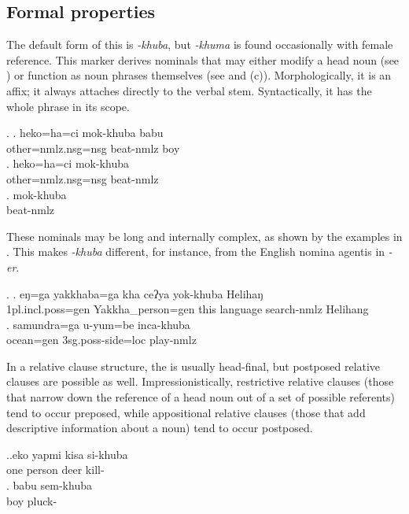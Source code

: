 \subsection{Formal properties} 
The default form of this  is \emph{-khuba}, but \emph{-khuma} is found occasionally with female reference. This marker derives nominals that may either modify a head noun (see \Next[a]) or function as noun phrases themselves (see \Next[b] and (c)). Morphologically, it is an affix; it always attaches directly to the verbal stem. Syntactically, it has the whole phrase  in its scope.
\newpage 

\ex. \ag.   heko=ha=ci mok-khuba babu\\
			other{\sc =nmlz.nsg=nsg} beat{\sc -nmlz} boy\\
			\bg. heko=ha=ci mok-khuba \\
			other{\sc =nmlz.nsg=nsg} beat{\sc -nmlz} \\
			\bg. mok-khuba\\
			beat{\sc -nmlz}\\
	
These nominals may be long and internally complex, as shown by the examples in \Next. This makes \emph{-khuba} different, for instance, from the English nomina agentis in \emph{-er}.
	
\ex. \ag.	eŋ=ga yakkhaba=ga kha  ceʔya   yok-khuba Helihaŋ\\
		{\sc 1pl.incl.poss=gen} Yakkha\_person{\sc =gen} this language  search{\sc -nmlz}	Helihang	\\ 
		 
		\bg. samundra=ga    u-yum=be            inca-khuba\\
		ocean{\sc =gen} {\sc 3sg.poss}-side{\sc =loc} play{\sc -nmlz}\\
		 
		
In a relative clause structure, the  is usually head-final, but postposed relative clauses are possible as well. Impressionistically, restrictive relative clauses (those that narrow down the reference of a head noun out of a set of possible referents) tend to occur  preposed, while appositional relative clauses (those that add descriptive information about a noun) tend to occur postposed. 
	
	\ex.\ag.eko yapmi kisa si-khuba\\
	one person deer kill-\\
	\bg. babu sem-khuba\\
	boy pluck-\\
	
